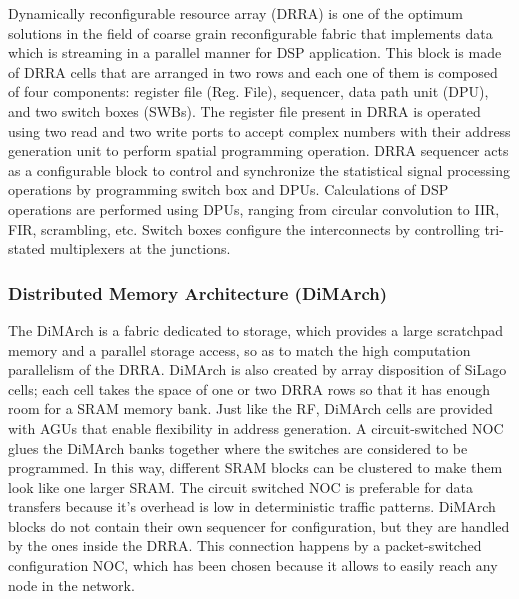\documentclass[journal]{IEEEtran}
\begin{document}
Dynamically reconfigurable resource array (DRRA) is one of the optimum solutions in the field of coarse grain reconfigurable fabric that implements data which is streaming in a parallel manner for DSP application. This block is made of DRRA cells that are arranged in two rows and each one of them is composed of four components: register file (Reg. File), sequencer, data path unit (DPU), and two switch boxes (SWBs). The register file present in DRRA is operated using two read and two write ports to accept complex numbers with their address generation unit to perform spatial programming operation. DRRA sequencer acts as a configurable block to control and synchronize the statistical signal processing operations by programming switch box and DPUs. Calculations of DSP operations are performed using DPUs, ranging from circular convolution to IIR, FIR, scrambling, etc. Switch boxes configure the interconnects by controlling tri-stated multiplexers at the junctions.
    
\subsubsection{Distributed Memory Architecture (DiMArch)}
The DiMArch is a fabric dedicated to storage, which provides a large scratchpad memory and a parallel storage access, so as to match the high computation parallelism of the DRRA. DiMArch is also created by array disposition of SiLago cells; each cell takes the space of one or two DRRA rows so that it has enough room for a SRAM memory bank. Just like the RF, DiMArch cells are provided with AGUs that enable flexibility in address generation. A circuit-switched NOC glues the DiMArch banks together where the switches are considered to be programmed. In this way, different SRAM blocks can be clustered to make them look like one larger SRAM. The circuit switched NOC is preferable for data transfers because it's overhead is low in deterministic traffic patterns. DiMArch blocks do not contain their own sequencer for configuration, but they are handled by the ones inside the DRRA. This connection happens by a packet-switched configuration NOC, which has been chosen because it allows to easily reach any node in the network.
\end{document}
